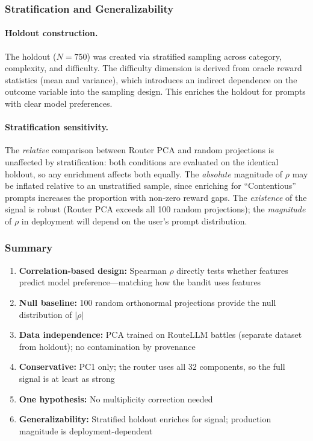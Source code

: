 \subsubsection{Stratification and Generalizability}

\paragraph{Holdout construction.}
The holdout ($N=750$) was created via stratified sampling across category,
complexity, and difficulty.  The difficulty dimension is derived from oracle
reward statistics (mean and variance), which introduces an indirect dependence
on the outcome variable into the sampling design.  This enriches the holdout
for prompts with clear model preferences.

\paragraph{Stratification sensitivity.}
The \emph{relative} comparison between Router PCA and random projections is
unaffected by stratification: both conditions are evaluated on the identical
holdout, so any enrichment affects both equally.  The \emph{absolute} magnitude
of $\rho$ may be inflated relative to an unstratified sample, since enriching
for ``Contentious'' prompts increases the proportion with non-zero reward gaps.
The \emph{existence} of the signal is robust (Router PCA exceeds all 100
random projections); the \emph{magnitude} of $\rho$ in deployment will depend
on the user's prompt distribution.

\subsubsection{Summary}

\begin{enumerate}[leftmargin=*,noitemsep,topsep=0pt]
    \item \textbf{Correlation-based design:} Spearman $\rho$ directly tests
    whether features predict model preference---matching how the bandit uses
    features
    \item \textbf{Null baseline:} 100 random orthonormal projections provide
    the null distribution of $|\rho|$
    \item \textbf{Data independence:} PCA trained on RouteLLM battles (separate
    dataset from holdout); no contamination by provenance
    \item \textbf{Conservative:} PC1 only; the router uses all 32 components,
    so the full signal is at least as strong
    \item \textbf{One hypothesis:} No multiplicity correction needed
    \item \textbf{Generalizability:} Stratified holdout enriches for signal;
    production magnitude is deployment-dependent
\end{enumerate}

